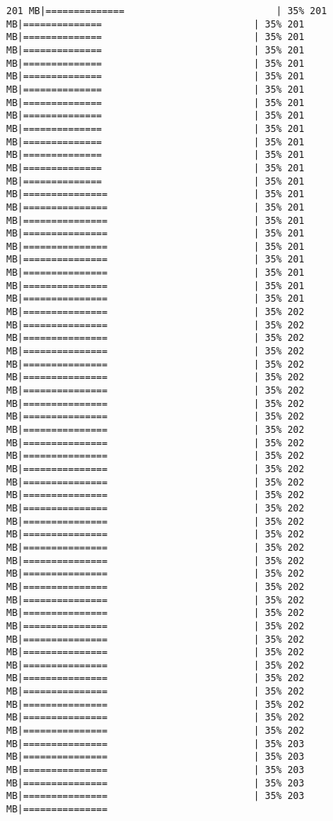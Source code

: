 \documentclass[
]{article}
\begin{document}
\begin{verbatim}
201 MB|==============                           | 35% 201 MB|==============                           | 35% 201 MB|==============                           | 35% 201 MB|==============                           | 35% 201 MB|==============                           | 35% 201 MB|==============                           | 35% 201 MB|==============                           | 35% 201 MB|==============                           | 35% 201 MB|==============                           | 35% 201 MB|==============                           | 35% 201 MB|==============                           | 35% 201 MB|==============                           | 35% 201 MB|==============                           | 35% 201 MB|==============                           | 35% 201 MB|===============                          | 35% 201 MB|===============                          | 35% 201 MB|===============                          | 35% 201 MB|===============                          | 35% 201 MB|===============                          | 35% 201 MB|===============                          | 35% 201 MB|===============                          | 35% 201 MB|===============                          | 35% 201 MB|===============                          | 35% 201 MB|===============                          | 35% 202 MB|===============                          | 35% 202 MB|===============                          | 35% 202 MB|===============                          | 35% 202 MB|===============                          | 35% 202 MB|===============                          | 35% 202 MB|===============                          | 35% 202 MB|===============                          | 35% 202 MB|===============                          | 35% 202 MB|===============                          | 35% 202 MB|===============                          | 35% 202 MB|===============                          | 35% 202 MB|===============                          | 35% 202 MB|===============                          | 35% 202 MB|===============                          | 35% 202 MB|===============                          | 35% 202 MB|===============                          | 35% 202 MB|===============                          | 35% 202 MB|===============                          | 35% 202 MB|===============                          | 35% 202 MB|===============                          | 35% 202 MB|===============                          | 35% 202 MB|===============                          | 35% 202 MB|===============                          | 35% 202 MB|===============                          | 35% 202 MB|===============                          | 35% 202 MB|===============                          | 35% 202 MB|===============                          | 35% 202 MB|===============                          | 35% 202 MB|===============                          | 35% 202 MB|===============                          | 35% 202 MB|===============                          | 35% 202 MB|===============                          | 35% 202 MB|===============                          | 35% 203 MB|===============                          | 35% 203 MB|===============                          | 35% 203 MB|===============                          | 35% 203 MB|===============                          | 35% 203 MB|===============   
\end{verbatim}
\end{document}
